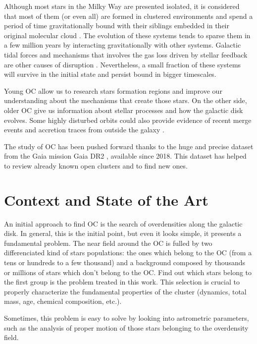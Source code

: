 \documentclass[11pt, a4paper, english]{book}
\begin{document}
Although most stars in the Milky Way are presented isolated, it is considered that most of them (or even all)
are formed in clustered environments and spend a period of time gravitationally bound with their siblings embedded
in their original molecular cloud
\cite[]{clarke2000theformationofstellarclusters} \cite[]{portegies2010young}.
The evolution of these systems tends to sparse them in a few million years by interacting gravitationally with other systems.
Galactic tidal forces and mechanisms that involves the gas loss driven by stellar feedback are other causes of disruption
\cite[]{brinkmann2017bound}.
Nevertheless, a small fraction of these systems will survive in the initial state and persist bound in bigger timescales.

Young OC allow us to research stars formation regions and improve our understanding about the mechanisms that create those stars.
On the other side, older OC give us information about stellar processes and how the galactic disk evolves.
Some highly disturbed orbits could also provide evidence of recent merge events and accretion traces from outside the galaxy
\cite[]{cantat2016abundances}.

The study of OC has been pushed forward thanks to the huge and precise dataset from the Gaia mission
\cite[]{collaboration2016description} Gaia DR2 \cite[]{gaia2018gaia}, available since 2018.
This dataset has helped to review already known open clusters and to find new ones.

\chapter{Context and State of the Art}

An initial approach to find OC is the search of overdensities along the galactic disk. In general, this is the initial point,
but even it looks simple, it presents a fundamental problem. The near field around the OC is fulled by two differenciated
kind of stars populations: the ones which belong to the OC (from a tens or hundreds to a few thousand) and a background composed
by thousands or millions of stars which don't belong to the OC. Find out which stars belong to the first group is the problem
treated in this work. This selection is crucial to properly characterize the fundamental properties of the cluster
(dynamics, total mass, age, chemical composition, etc.).

Sometimes, this problem is easy to solve by looking into astrometric parameters, such as the analysis of proper motion of those
stars belonging to the overdensity field.
\end{document}
